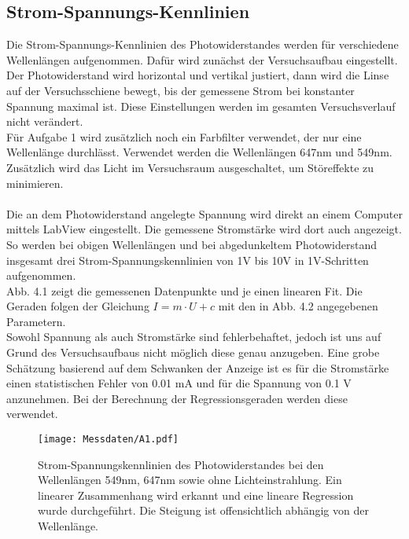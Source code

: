 \subsection{Strom-Spannungs-Kennlinien}


Die Strom-Spannungs-Kennlinien des Photowiderstandes werden für verschiedene Wellenlängen aufgenommen. Dafür wird zunächst der Versuchsaufbau eingestellt. Der Photowiderstand wird horizontal und vertikal justiert, dann wird die Linse auf der Versuchsschiene bewegt, bis der gemessene Strom bei konstanter Spannung maximal ist. Diese Einstellungen werden im gesamten Versuchsverlauf nicht verändert. \\
Für Aufgabe 1 wird zusätzlich noch ein Farbfilter verwendet, der nur eine Wellenlänge durchlässt. Verwendet werden die Wellenlängen 647nm und 549nm. Zusätzlich wird das Licht im Versuchsraum ausgeschaltet, um Störeffekte zu minimieren. \\
\\
Die an dem Photowiderstand angelegte Spannung wird direkt an einem Computer mittels LabView eingestellt. Die gemessene Stromstärke wird dort auch angezeigt. So werden bei obigen Wellenlängen und bei abgedunkeltem Photowiderstand insgesamt drei Strom-Spannungskennlinien von 1V bis 10V in 1V-Schritten aufgenommen. \\
Abb. 4.1 zeigt die gemessenen Datenpunkte und je einen linearen Fit. Die Geraden folgen der Gleichung $I = m \cdot U + c$ mit den in Abb. 4.2 angegebenen Parametern. \\
Sowohl Spannung als auch Stromstärke sind fehlerbehaftet, jedoch ist uns auf Grund des Versuchsaufbaus nicht möglich diese genau anzugeben. Eine grobe Schätzung basierend auf dem Schwanken der Anzeige ist es für die Stromstärke einen statistischen Fehler von 0.01 mA und für die Spannung von 0.1 V anzunehmen. Bei der Berechnung der Regressionsgeraden werden diese verwendet.

\begin{figure}
\label{A1_reg}
\centering
\texttt{[image: Messdaten/A1.pdf]}
\caption{Strom-Spannungskennlinien des Photowiderstandes bei den Wellenlängen 549nm, 647nm sowie ohne Lichteinstrahlung. Ein linearer Zusammenhang wird erkannt und eine lineare Regression wurde durchgeführt. Die Steigung ist offensichtlich abhängig von der Wellenlänge.}
\end{figure}

